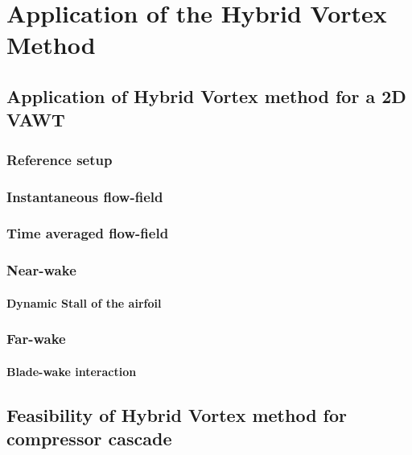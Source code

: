 \chapter{Application of the Hybrid Vortex Method}


\section{Application of Hybrid Vortex method for a 2D VAWT}

\subsection{Reference setup}

\subsection{Instantaneous flow-field}

\subsection{Time averaged flow-field}

\subsection{Near-wake}

\subsubsection{Dynamic Stall of the airfoil}

\subsection{Far-wake}

\subsubsection{Blade-wake interaction}

\section{Feasibility of Hybrid Vortex method for compressor cascade}

